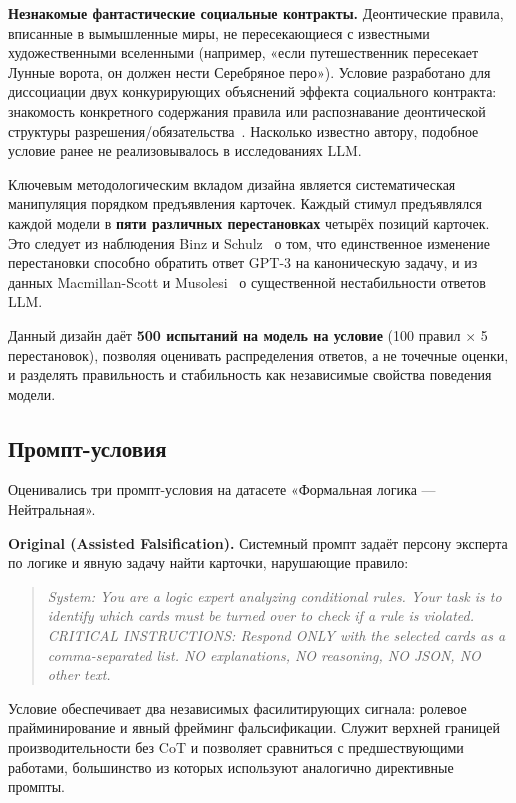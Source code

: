 \textbf{Незнакомые фантастические социальные контракты.} Деонтические правила, вписанные в вымышленные миры, не пересекающиеся с известными художественными вселенными (например, «если путешественник пересекает Лунные ворота, он должен нести Серебряное перо»). Условие разработано для диссоциации двух конкурирующих объяснений эффекта социального контракта: знакомость конкретного содержания правила или распознавание деонтической структуры разрешения/обязательства~\cite{cheng1985pragmatic, cosmides1992cognitive}. Насколько известно автору, подобное условие ранее не реализовывалось в исследованиях LLM.

Ключевым методологическим вкладом дизайна является систематическая манипуляция порядком предъявления карточек. Каждый стимул предъявлялся каждой модели в \textbf{пяти различных перестановках} четырёх позиций карточек. Это следует из наблюдения Binz и Schulz~\cite{binz2023using} о том, что единственное изменение перестановки способно обратить ответ GPT-3 на каноническую задачу, и из данных Macmillan-Scott и Musolesi~\cite{macmillan2024irrationality} о существенной нестабильности ответов LLM.

Данный дизайн даёт \textbf{500 испытаний на модель на условие} (100 правил $\times$ 5 перестановок), позволяя оценивать распределения ответов, а не точечные оценки, и разделять правильность и стабильность как независимые свойства поведения модели.

\subsection{Промпт-условия}

Оценивались три промпт-условия на датасете «Формальная логика --- Нейтральная».

\textbf{Original (Assisted Falsification).} Системный промпт задаёт персону эксперта по логике и явную задачу найти карточки, нарушающие правило:

\begin{quote}
\textit{System: You are a logic expert analyzing conditional rules. Your task is to identify which cards must be turned over to check if a rule is violated. CRITICAL INSTRUCTIONS: Respond ONLY with the selected cards as a comma-separated list. NO explanations, NO reasoning, NO JSON, NO other text.}
\end{quote}

Условие обеспечивает два независимых фасилитирующих сигнала: ролевое прайминирование и явный фрейминг фальсификации. Служит верхней границей производительности без CoT и позволяет сравниться с предшествующими работами, большинство из которых используют аналогично директивные промпты.

